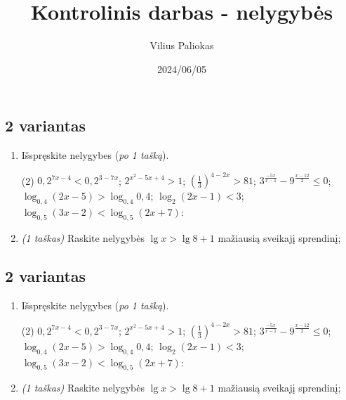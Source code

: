 \documentclass[a4paper]{article}
\title{Kontrolinis darbas - nelygybės}
\author{Vilius Paliokas}
\date{2024/06/05}
\begin{document}
\thispagestyle{fancy}

\titlespacing*{\subsection}{0pt}{.75ex}{0.75ex}

\subsection*{2 variantas}

\begin{enumerate}
      \item Išspręskite nelygybes (\textit{po 1 tašką}).

            \begin{tasks}[item-format={\normalfont}, after-item-skip=2mm](2)
                  \task $0,2^{7x-4} < 0,2^{3-7x}$;
                  \task $2^{x^2-5x+4} > 1$;
                  \task $(\frac{1}{3})^{4-2x} > 81$;
                  \task $3^{\frac{-5x}{x-1}}-9^{\frac{x-12}{2}} \leqslant 0$;
                  \task $\log_{0,4}(2x-5) > \log_{0,4}0,4$;
                  \task $\log_{2}(2x-1) < 3$;
                  \task $\log_{0,5}(3x-2) < \log_{0,5}(2x+7)$:
            \end{tasks}

      \item \textit{(1 taškas)} Raskite nelygybės $\lg{x}>\lg{8}+1$ mažiausią sveikajį sprendinį;

\end{enumerate}

\vspace*{6mm}

\subsection*{2 variantas}

\begin{enumerate}
      \item Išspręskite nelygybes (\textit{po 1 tašką}).

            \begin{tasks}[item-format={\normalfont}, after-item-skip=2mm](2)
                  \task $0,2^{7x-4} < 0,2^{3-7x}$;
                  \task $2^{x^2-5x+4} > 1$;
                  \task $(\frac{1}{3})^{4-2x} > 81$;
                  \task $3^{\frac{-5x}{x-1}}-9^{\frac{x-12}{2}} \leqslant 0$;
                  \task $\log_{0,4}(2x-5) > \log_{0,4}0,4$;
                  \task $\log_{2}(2x-1) < 3$;
                  \task $\log_{0,5}(3x-2) < \log_{0,5}(2x+7)$:
            \end{tasks}

      \item \textit{(1 taškas)} Raskite nelygybės $\lg{x}>\lg{8}+1$ mažiausią sveikajį sprendinį;

\end{enumerate}
\end{document}
